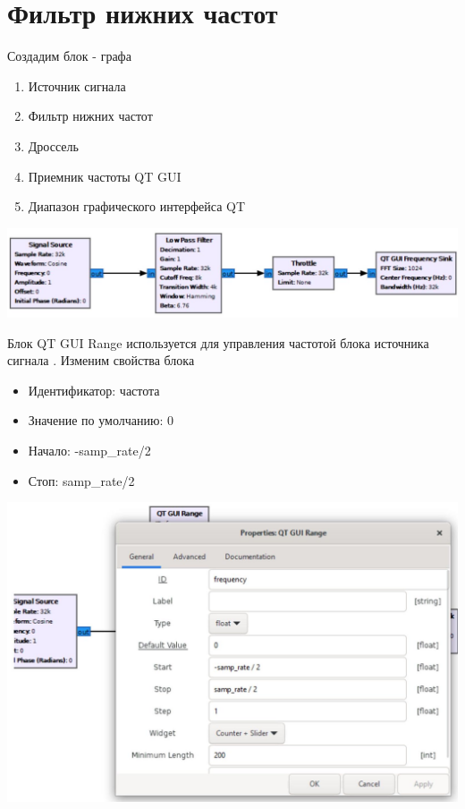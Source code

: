 \documentclass[10pt]{article}
\begin{document}
\section*{Фильтр нижних частот}
Создадим блок - графа

\begin{enumerate}
  \item Источник сигнала

  \item Фильтр нижних частот

  \item Дроссель

  \item Приемник частоты QT GUI

  \item Диапазон графического интерфейса QT

\end{enumerate}

\begin{center}
\includegraphics[max width=\textwidth]{cxema}
\end{center}

Блок QT GUI Range используется для управления частотой блока источника сигнала . Изменим свойства блока

\begin{itemize}
  \item Идентификатор: частота

  \item Значение по умолчанию: 0

  \item Начало: -samp\_rate/2

  \item Стоп: samp\_rate/2

\end{itemize}

\begin{center}
\includegraphics[max width=\textwidth]{QT}
\end{center}
\end{document}
